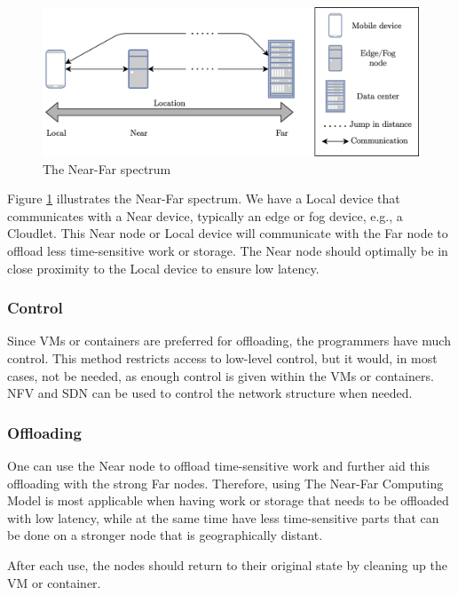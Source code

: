 \begin{figure}[t]
    \centering
    \includegraphics[scale=1]{chapters/6_evaluation/figures/near-far_diagram.png}
    \caption{The Near-Far spectrum}
    \label{fig:nearFarSimple}
\end{figure}


Figure \ref{fig:nearFarSimple} illustrates the Near-Far spectrum. We have a Local device that communicates with a Near device, typically an edge or fog device, e.g., a Cloudlet. This Near node or Local device will communicate with the Far node to offload less time-sensitive work or storage. The Near node should optimally be in close proximity to the Local device to ensure low latency.

\subsubsection{Control}
Since VMs or containers are preferred for offloading, the programmers have much control. This method restricts access to low-level control, but it would, in most cases, not be needed, as enough control is given within the VMs or containers. NFV and SDN can be used to control the network structure when needed.

\subsubsection{Offloading}
One can use the Near node to offload time-sensitive work and further aid this offloading with the strong Far nodes. Therefore, using The Near-Far Computing Model is most applicable when having work or storage that needs to be offloaded with low latency, while at the same time have less time-sensitive parts that can be done on a stronger node that is geographically distant. 

After each use, the nodes should return to their original state by cleaning up the VM or container.


